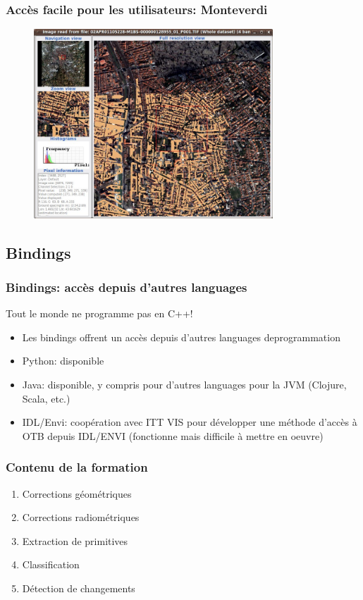\documentclass[compress]{beamer}
\begin{document}
\begin{frame}
\frametitle{Accès facile pour les utilisateurs: Monteverdi}
\begin{figure}[]
  \includegraphics[width=0.8\textwidth]{monteverdi2.jpg}
\end{figure}
\end{frame}

\subsection{Bindings}
\begin{frame}
\frametitle{Bindings: accès depuis d'autres languages}
\begin{block}{Tout le monde ne programme pas en C++!}
\scriptsize
\begin{itemize}
\item Les bindings offrent un accès depuis d'autres languages deprogrammation
\item \alert{Python}: disponible
\item \alert{Java}: disponible, y compris pour d'autres languages pour
  la JVM (Clojure, Scala, etc.)
\item \alert{IDL/Envi}: coopération avec ITT VIS pour développer une
  méthode d'accès à OTB depuis IDL/ENVI (fonctionne mais difficile à
  mettre en oeuvre)
\end{itemize}
\end{block}
\end{frame}


\begin{frame}
  \frametitle{Contenu de la formation}
  \begin{enumerate}
  \item Corrections géométriques
  \item Corrections radiométriques
  \item Extraction de primitives
  \item Classification
  \item Détection de changements
  \end{enumerate}
\end{frame}
\end{document}
